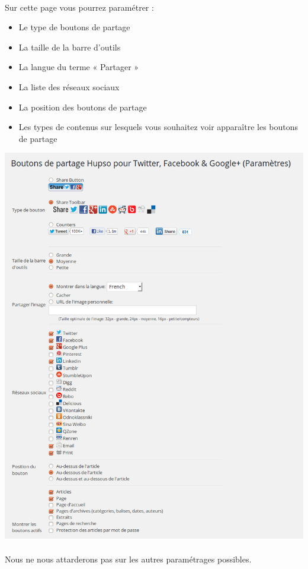 \documentclass[10pt,a4paper]{article}
\begin{document}
\paragraph{}Sur cette page vous pourrez paramétrer :
\begin{itemize}
\item Le type de boutons de partage
\item La taille de la barre d'outils
\item La langue du terme « Partager »
\item La liste des réseaux sociaux
\item La position des boutons de partage
\item Les types de contenus sur lesquels vous souhaitez voir apparaître les boutons de partage
\end{itemize}
\begin{center}
\includegraphics[scale=0.3]{img/0177.png}
\end{center}
\paragraph{}Nous ne nous attarderons pas sur les autres paramétrages possibles.
\end{document}
